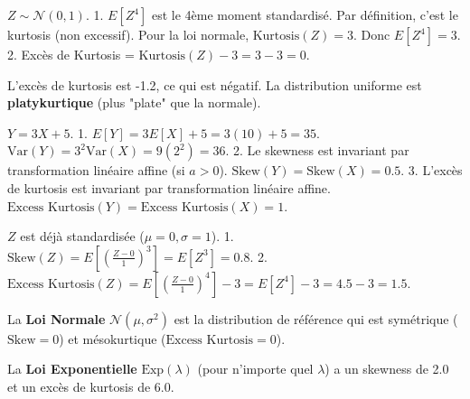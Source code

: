 \begin{correctionbox}
$Z \sim \mathcal{N}(0, 1)$.
1.  $E[Z^4]$ est le 4ème moment standardisé. Par définition, c'est le kurtosis (non excessif). Pour la loi normale, $\text{Kurtosis}(Z) = 3$. Donc $E[Z^4] = 3$.
2.  Excès de Kurtosis = $\text{Kurtosis}(Z) - 3 = 3 - 3 = 0$.
\end{correctionbox}

\begin{correctionbox}
L'excès de kurtosis est -1.2, ce qui est négatif.
La distribution uniforme est \textbf{platykurtique} (plus "plate" que la normale).
\end{correctionbox}


\begin{correctionbox}
$Y = 3X + 5$.
1.  $E[Y] = 3E[X] + 5 = 3(10) + 5 = 35$.
    $\text{Var}(Y) = 3^2 \text{Var}(X) = 9 (2^2) = 36$.
2.  Le skewness est invariant par transformation linéaire affine (si $a>0$). $\text{Skew}(Y) = \text{Skew}(X) = 0.5$.
3.  L'excès de kurtosis est invariant par transformation linéaire affine. $\text{Excess Kurtosis}(Y) = \text{Excess Kurtosis}(X) = 1$.
\end{correctionbox}

\begin{correctionbox}
$Z$ est déjà standardisée ($\mu=0, \sigma=1$).
1.  $\text{Skew}(Z) = E\left[ \left( \frac{Z - 0}{1} \right)^3 \right] = E[Z^3] = 0.8$.
2.  $\text{Excess Kurtosis}(Z) = E\left[ \left( \frac{Z - 0}{1} \right)^4 \right] - 3 = E[Z^4] - 3 = 4.5 - 3 = 1.5$.
\end{correctionbox}

\begin{correctionbox}
La \textbf{Loi Normale} $\mathcal{N}(\mu, \sigma^2)$ est la distribution de référence qui est symétrique ($\text{Skew}=0$) et mésokurtique ($\text{Excess Kurtosis}=0$).
\end{correctionbox}

\begin{correctionbox}
La \textbf{Loi Exponentielle} $\text{Exp}(\lambda)$ (pour n'importe quel $\lambda$) a un skewness de 2.0 et un excès de kurtosis de 6.0.
\end{correctionbox}


